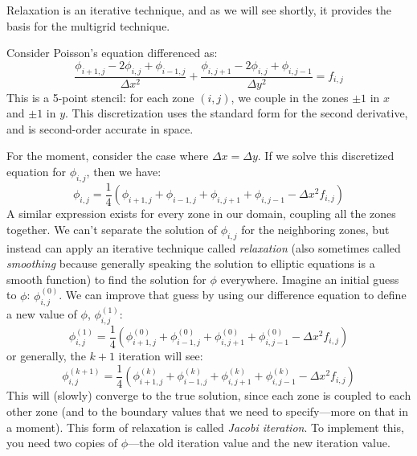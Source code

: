 Relaxation is an iterative technique, and as we will see shortly, it
provides the basis for the multigrid technique.  

Consider Poisson's equation differenced as:
\begin{equation}
\frac{\phi_{i+1,j} - 2 \phi_{i,j} + \phi_{i-1,j}}{\Delta x^2} +
\frac{\phi_{i,j+1} - 2 \phi_{i,j} + \phi_{i,j-1}}{\Delta y^2} = f_{i,j}
\end{equation}
This is a 5-point stencil: for each zone $(i,j)$, we couple in the
zones $\pm 1$ in $x$ and $\pm 1$ in $y$.  This discretization uses
the standard form for the second derivative, and is second-order
accurate in space.  

For the moment, consider the case where $\Delta x = \Delta y$.  If we
solve this discretized equation for $\phi_{i,j}$, then we have:
\begin{equation}
\phi_{i,j} = \frac{1}{4} (\phi_{i+1,j} + \phi_{i-1,j} + 
                          \phi_{i,j+1} + \phi_{i,j-1} - \Delta x^2 f_{i,j} )
\end{equation}
A similar expression exists for every zone in our domain, coupling all
the zones together.  We can't separate the solution of $\phi_{i,j}$
for the neighboring zones, but instead can apply an iterative
technique called {\em relaxation} (also sometimes called {\em
  smoothing} because generally speaking the solution to elliptic
equations is a smooth function) to find the solution for $\phi$
everywhere.  Imagine an initial guess to $\phi$: $\phi_{i,j}^{(0)}$.
We can improve that guess by using our difference equation to define a
new value of $\phi$, $\phi_{i,j}^{(1)}$:
\begin{equation}
\phi_{i,j}^{(1)} = \frac{1}{4} (\phi_{i+1,j}^{(0)} + \phi_{i-1,j}^{(0)} + 
                                \phi_{i,j+1}^{(0)} + \phi_{i,j-1}^{(0)} - 
                                 \Delta x^2 f_{i,j} )
\end{equation}
or generally, the $k+1$ iteration will see:
\begin{equation}
\phi_{i,j}^{(k+1)} = \frac{1}{4} (\phi_{i+1,j}^{(k)} + \phi_{i-1,j}^{(k)} + 
                                  \phi_{i,j+1}^{(k)} + \phi_{i,j-1}^{(k)} - 
                                   \Delta x^2 f_{i,j} )
\end{equation}
This will (slowly) converge to the true solution, since each zone is
coupled to each other zone (and to the boundary values that we need to
specify---more on that in a moment).  This form of relaxation is
called {\em Jacobi iteration}.  To implement this, you need two copies
of $\phi$---the old iteration value and the new iteration value.

